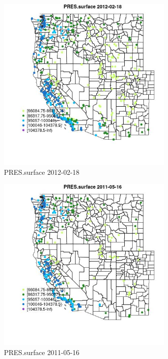 \begin{figure} 
\centering  
\includegraphics[width=0.77\textwidth]{Code_Outputs/Report_ML_input_PM25_Step4_part_f_de_duplicated_aveswNAs_MapObsPRESsurface2012-02-18.jpg} 
\caption{\label{fig:Report_ML_input_PM25_Step4_part_f_de_duplicated_aveswNAsMapObsPRESsurface2012-02-18}PRES.surface 2012-02-18} 
\end{figure} 
 

\begin{figure} 
\centering  
\includegraphics[width=0.77\textwidth]{Code_Outputs/Report_ML_input_PM25_Step4_part_f_de_duplicated_aveswNAs_MapObsPRESsurface2011-05-16.jpg} 
\caption{\label{fig:Report_ML_input_PM25_Step4_part_f_de_duplicated_aveswNAsMapObsPRESsurface2011-05-16}PRES.surface 2011-05-16} 
\end{figure} 
 

